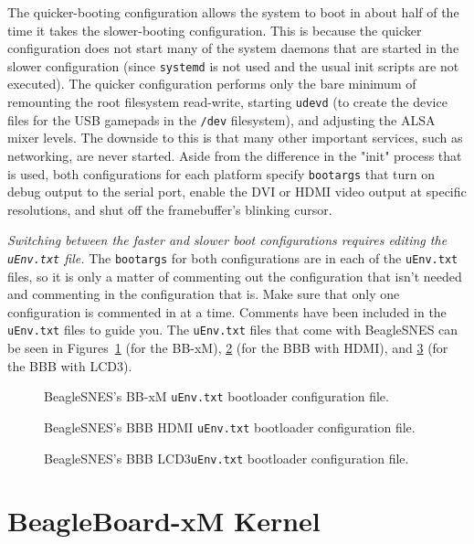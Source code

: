 The quicker-booting configuration allows the system to boot in about half of the time it takes the slower-booting configuration.  This is because the quicker configuration does not start many of the system daemons that are started in the slower configuration (since \texttt{systemd} is not used and the usual init scripts are not executed).  The quicker configuration performs only the bare minimum of remounting the root filesystem read-write, starting \texttt{udevd} (to create the device files for the USB gamepads in the \texttt{/dev} filesystem), and adjusting the ALSA mixer levels.  The downside to this is that many other important services, such as networking, are never started.  Aside from the difference in the "init" process that is used, both configurations for each platform specify \texttt{bootargs} that turn on debug output to the serial port, enable the DVI or HDMI video output at specific resolutions, and shut off the framebuffer's blinking cursor.

\emph{Switching between the faster and slower boot configurations requires editing the \texttt{uEnv.txt} file.} The \texttt{bootargs} for both configurations are in each of the \texttt{uEnv.txt} files, so it is only a matter of commenting out the configuration that isn't needed and commenting in the configuration that is.  Make sure that only one configuration is commented in at a time.  Comments have been included in the \texttt{uEnv.txt} files to guide you.  The \texttt{uEnv.txt} files that come with BeagleSNES can be seen in Figures~\ref{fig:BBxM_uEnv} (for the BB-xM), \ref{fig:BBB-HDMI_uEnv} (for the BBB with HDMI), and \ref{fig:BBB-LCD3_uEnv} (for the BBB with LCD3).

\begin{figure}[h]

\caption{BeagleSNES's BB-xM \texttt{uEnv.txt} bootloader configuration file.}\label{fig:BBxM_uEnv}
\end{figure}
\begin{figure}[h]

\caption{BeagleSNES's BBB HDMI \texttt{uEnv.txt} bootloader configuration file.}\label{fig:BBB-HDMI_uEnv}
\end{figure}
\begin{figure}[h]

\caption{BeagleSNES's BBB LCD3\texttt{uEnv.txt} bootloader configuration file.}\label{fig:BBB-LCD3_uEnv}
\end{figure}

\section{BeagleBoard-xM Kernel}

